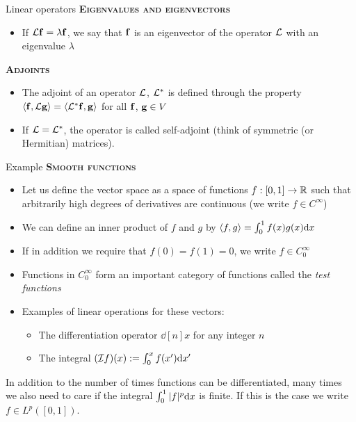 \begin{frame}{Linear operators}	
	\textbf{\textsc{Eigenvalues and eigenvectors}}
	\begin{itemize}
		\item If $ \mathcal{L} \mathbf{f} = \lambda \mathbf{f} $, we say that $ \mathbf{f} $ is an \alert{eigenvector} of the operator $ \mathcal{L} $ with an \alert{eigenvalue} $ \lambda $
	\end{itemize}
	\textbf{\textsc{Adjoints}}
	\begin{itemize}
		\item The adjoint of an operator $ \mathcal{L} $, $ \mathcal{L}^* $ is defined through the property $ \langle \mathbf{f},\mathcal{L} \mathbf{g} \rangle = \langle \mathcal{L}^* \mathbf{f}, \mathbf{g} \rangle $ for all $ \mathbf{f} $, $ \mathbf{g} \in V $
		\item If $ \mathcal{L} = \mathcal{L}^* $, the operator is called self-adjoint
		(think of symmetric (or Hermitian) matrices).
	\end{itemize}
\end{frame}


\begin{frame}{Example \theexample}	
	\textbf{\textsc{Smooth functions}}
	\begin{itemize}
		\item Let us define the vector space as a space of functions $ f: [0,1] \to \mathbb{R} $ such that arbitrarily high degrees of derivatives are continuous (we write $ f\in C^\infty $)
		\item We can define an inner product of $ f $ and $ g $ by $ \langle f,g \rangle = \int_{0}^{1} f(x)g(x) \mathrm{d} x $
		\item If in addition we require that $ f(0)=f(1)=0 $, we write $ f \in C^\infty_0 $
		\item Functions in $ C^\infty_0 $ form an important category of functions called the \emph{test functions}
		\item Examples of linear operations for these vectors:
		\begin{itemize}
			\item The differentiation operator $ \dd[n]{}{x} $ for any integer $ n $
			\item The integral $ (\mathcal{I} f)(x) := \int_{0}^{x} f(x') \mathrm{d} x' $
		\end{itemize}
	\end{itemize}
{\color{olive} In addition to the number of times functions can be differentiated, many times we also need to care if the integral $ \int_{0}^{1} |f|^p \mathrm{d} x  $ is finite. If this is the case we write $ f \in L^p([0,1]) $. 
}
\end{frame}


